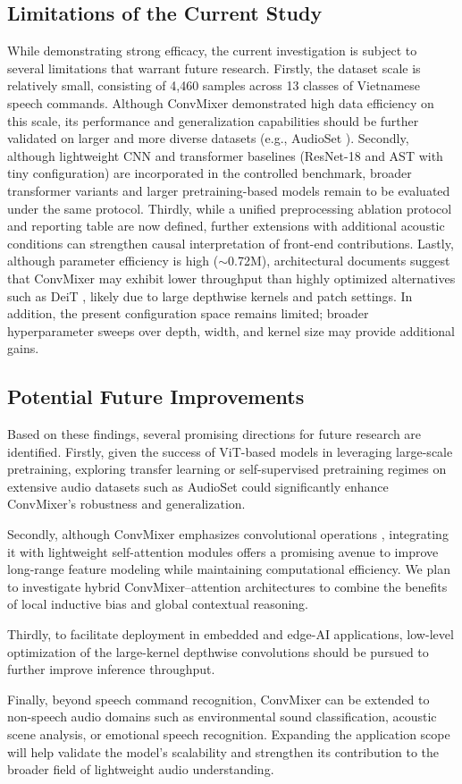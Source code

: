 \subsection*{Limitations of the Current Study}
While demonstrating strong efficacy, the current investigation is subject to several limitations that warrant future research. Firstly, the dataset scale is relatively small, consisting of 4,460 samples across 13 classes of Vietnamese speech commands. Although ConvMixer demonstrated high data efficiency on this scale, its performance and generalization capabilities should be further validated on larger and more diverse datasets (e.g., AudioSet \cite{Gemmeke2017AudioSet}). Secondly, although lightweight CNN and transformer baselines (ResNet-18 and AST with tiny configuration) are incorporated in the controlled benchmark, broader transformer variants and larger pretraining-based models remain to be evaluated under the same protocol. Thirdly, while a unified preprocessing ablation protocol and reporting table are now defined, further extensions with additional acoustic conditions can strengthen causal interpretation of front-end contributions. Lastly, although parameter efficiency is high ($\sim$0.72M), architectural documents suggest that ConvMixer may exhibit lower throughput than highly optimized alternatives such as DeiT \cite{Touvron2020DeiT}, likely due to large depthwise kernels and patch settings. In addition, the present configuration space remains limited; broader hyperparameter sweeps over depth, width, and kernel size may provide additional gains.

\subsection*{Potential Future Improvements}

Based on these findings, several promising directions for future research are identified. Firstly, given the success of ViT-based models \cite{dosovitskiy2020image} in leveraging large-scale pretraining, exploring transfer learning or self-supervised pretraining regimes on extensive audio datasets such as AudioSet \cite{Gemmeke2017AudioSet} could significantly enhance ConvMixer's robustness and generalization. 

Secondly, although ConvMixer emphasizes convolutional operations \cite{trockman2022patchesneed}, integrating it with lightweight self-attention modules offers a promising avenue to improve long-range feature modeling while maintaining computational efficiency. We plan to investigate hybrid ConvMixer–attention architectures to combine the benefits of local inductive bias and global contextual reasoning.

Thirdly, to facilitate deployment in embedded and edge-AI applications, low-level optimization of the large-kernel depthwise convolutions should be pursued to further improve inference throughput. 

Finally, beyond speech command recognition, ConvMixer can be extended to non-speech audio domains such as environmental sound classification, acoustic scene analysis, or emotional speech recognition. Expanding the application scope will help validate the model’s scalability and strengthen its contribution to the broader field of lightweight audio understanding.
